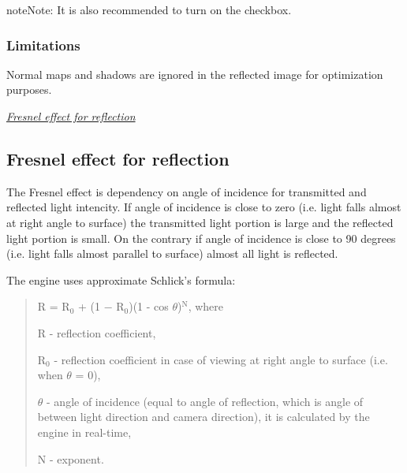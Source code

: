 \documentclass[a4paper,12pt,oneside]{sphinxmanual}
\begin{document}
\begin{notice}{note}{Note:}
It is also recommended to turn on the  checkbox.
\end{notice}


\subsubsection{Limitations}
\label{materials:id10}
Normal maps and shadows are ignored in the reflected image for optimization purposes.




{\hyperref[materials:fresnel]{\emph{Fresnel effect for reflection}}}




\subsection{Fresnel effect for reflection}
\label{materials:id11}\label{materials:fresnel}\label{materials:index-8}
The Fresnel effect is dependency on angle of incidence for transmitted and reflected light intencity. If angle of incidence is close to zero (i.e. light falls almost at right angle to surface) the transmitted light portion is large and the reflected light portion is small. On the contrary if angle of incidence is close to 90 degrees (i.e. light falls almost parallel to surface) almost all light is reflected.

The engine uses approximate Schlick's formula:
\begin{quote}

R = R$_{\text{0}}$ + (1 − R$_{\text{0}}$)(1 - cos \(\theta\))$^{\text{N}}$, where

R - reflection coefficient,

R$_{\text{0}}$ - reflection coefficient in case of viewing at right angle to surface (i.e. when \(\theta\) = 0),

\(\theta\) - angle of incidence (equal to angle of reflection, which is angle of between light direction and camera direction), it is calculated by the engine in real-time,

N - exponent.
\end{quote}
\end{document}
